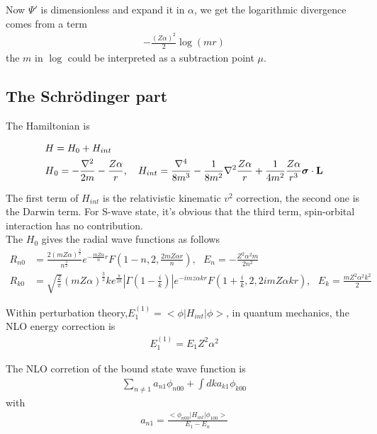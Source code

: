 \documentclass{article}
\renewcommand{\a}{\alpha}
\newcommand{\s}{\sigma}
\begin{document}
Now $\Psi '$ is dimensionless and expand it in $\alpha$, we get the logarithmic divergence comes from a term
\begin{align}
	-\frac{(Z\alpha)^2}{2}\log(m r)
\end{align}
the $m$ in $\log$ could be interpreted as a subtraction point $\mu$.

\subsection{The Schr\"odinger part}

The Hamiltonian is

\begin{align}
	H & =H_0+H_{int}                                                                                                                            \\
	H & _0=-\frac{\nabla^2}{2m}-\frac{Z\alpha}{r},\ \ \ H_{int}=\frac{\nabla^4}{8m^3}-\frac{1}{8m^2}\nabla^2\frac{Z\a}{r}+\frac{1}{4m^2}\frac{Z\a}{r^3}\bm{\s}\cdot\vb{L}
\end{align}

The first term of $H_{int}$ is the relativistic kinematic $v^2$ correction, the second one is the Darwin term. For S-wave state, it's obvious that the third term, spin-orbital interaction has no contribution. \\
The $H_0$ gives the radial wave functions as follows
\begin{align}
	R_{n0} & =\frac{2(mZ\alpha)^\frac{3}{2}}{n^\frac{3}{2}}e^{-\frac{mZ\alpha}{n}r}F(1-n,2,\frac{2mZ\alpha r}{n}),\ \ \ E_n=-\frac{Z^2\alpha^2m}{2n^2}                                \\
	R_{k0} & =\sqrt{\frac{2}{\pi}}(mZ\alpha)^\frac{3}{2}ke^\frac{\pi}{2k}|\Gamma(1-\frac{i}{k})|e^{-imz\alpha kr}F(1+\frac{i}{k},2,2imZ\alpha kr),\ \ \ E_k=\frac{mZ^2\alpha^2k^2}{2}
\end{align}

Within perturbation theory,$E_1^{(1)}=<\phi|H_{int}|\phi>$, in quantum mechanics, the NLO energy correction is
\begin{align}
	E_1^{(1)}=E_1Z^2\alpha^2
\end{align}

The NLO corretion of the bound state wave function is
\begin{align}
	\sum_{n\neq 1}a_{n1}\phi_{n00}+\int dka_{k1}\phi_{k00}
\end{align}
with
\begin{align}
	a_{n1}=\frac{<\phi_{n00}|H_{int}|\phi_{100}>}{E_1-E_n}
\end{align}
\end{document}
